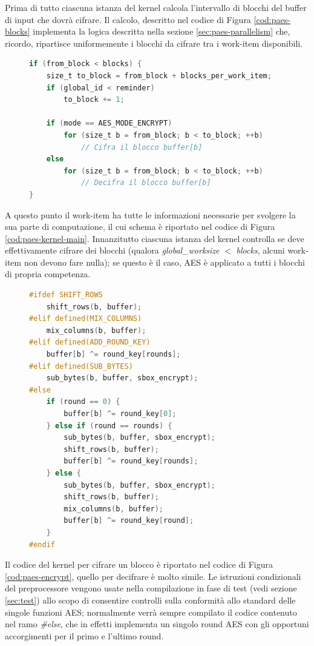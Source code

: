 \documentclass[12pt,a4paper,oneside]{book}
\begin{document}
Prima di tutto ciascuna istanza del kernel calcola l'intervallo di blocchi del buffer di input che dovrà cifrare. Il calcolo, descritto nel codice di Figura \ref{cod:paes-blocks} implementa la logica descritta nella sezione \ref{sec:paes-parallelism} che, ricordo, ripartisce uniformemente i blocchi da cifrare tra i work-item disponibili.

\begin{figure}
\begin{lstlisting}[caption={\textit{Codice principale del kernel.}},label={cod:paes-kernel-main},language=C]
if (from_block < blocks) {
	size_t to_block = from_block + blocks_per_work_item;	
	if (global_id < reminder) 
		to_block += 1;

	if (mode == AES_MODE_ENCRYPT)
	    for (size_t b = from_block; b < to_block; ++b)
            // Cifra il blocco buffer[b]
    else
	    for (size_t b = from_block; b < to_block; ++b)
            // Decifra il blocco buffer[b]
}
\end{lstlisting}
\end{figure}

A questo punto il work-item ha tutte le informazioni necessarie per svolgere la sua parte di computazione, il cui schema è riportato nel codice di Figura \ref{cod:paes-kernel-main}. Innanzitutto ciascuna istanza del kernel controlla se deve effettivamente cifrare dei blocchi (qualora \textit{global\_worksize} $<$ \textit{blocks}, alcuni work-item non devono fare nulla); se questo è il caso, \ac{AES} è applicato a tutti i blocchi di propria competenza.

\begin{figure}
\begin{lstlisting}[caption={\textit{Codice kernel per la cifratura di un blocco.}},label={cod:paes-encrypt},language=C]
#ifdef SHIFT_ROWS
	shift_rows(b, buffer);
#elif defined(MIX_COLUMNS)
	mix_columns(b, buffer);
#elif defined(ADD_ROUND_KEY)
	buffer[b] ^= round_key[rounds];
#elif defined(SUB_BYTES)
	sub_bytes(b, buffer, sbox_encrypt);
#else
	if (round == 0) {
		buffer[b] ^= round_key[0];
	} else if (round == rounds) {
		sub_bytes(b, buffer, sbox_encrypt);
		shift_rows(b, buffer);
		buffer[b] ^= round_key[rounds];
	} else {
		sub_bytes(b, buffer, sbox_encrypt);
		shift_rows(b, buffer);
		mix_columns(b, buffer);
		buffer[b] ^= round_key[round];
	}
#endif
\end{lstlisting}
\end{figure}

Il codice del kernel per cifrare un blocco è riportato nel codice di Figura \ref{cod:paes-encrypt}, quello per decifrare è molto simile. Le istruzioni condizionali del preprocessore vengono usate nella compilazione in fase di test (vedi sezione \ref{sec:test}) allo scopo di consentire controlli sulla conformità allo standard delle singole funzioni \ac{AES}; normalmente verrà sempre compilato il codice contenuto nel ramo \textit{\#else}, che in effetti implementa un singolo round \ac{AES} con gli opportuni accorgimenti per il primo e l'ultimo round.
\end{document}
